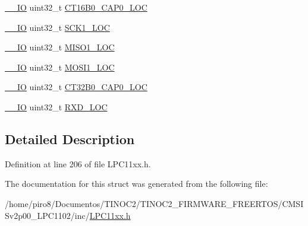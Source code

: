 \begin{DoxyCompactItemize}
\item 
\hyperlink{group___c_m_s_i_s__core__definitions_gaec43007d9998a0a0e01faede4133d6be}{\+\_\+\+\_\+\+IO} uint32\+\_\+t \hyperlink{group___l_p_c11xx___definitions_ga665596a8d6cc6bd6f61485aba90d62c5}{C\+T16\+B0\+\_\+\+C\+A\+P0\+\_\+\+L\+OC}
\item 
\hyperlink{group___c_m_s_i_s__core__definitions_gaec43007d9998a0a0e01faede4133d6be}{\+\_\+\+\_\+\+IO} uint32\+\_\+t \hyperlink{group___l_p_c11xx___definitions_gad6627c21723c298dedcef119bff3ca6e}{S\+C\+K1\+\_\+\+L\+OC}
\item 
\hyperlink{group___c_m_s_i_s__core__definitions_gaec43007d9998a0a0e01faede4133d6be}{\+\_\+\+\_\+\+IO} uint32\+\_\+t \hyperlink{group___l_p_c11xx___definitions_ga3aed5efce144c7f27500230e8cbbbf2f}{M\+I\+S\+O1\+\_\+\+L\+OC}
\item 
\hyperlink{group___c_m_s_i_s__core__definitions_gaec43007d9998a0a0e01faede4133d6be}{\+\_\+\+\_\+\+IO} uint32\+\_\+t \hyperlink{group___l_p_c11xx___definitions_ga50678fa63c5721d9e4622405102531be}{M\+O\+S\+I1\+\_\+\+L\+OC}
\item 
\hyperlink{group___c_m_s_i_s__core__definitions_gaec43007d9998a0a0e01faede4133d6be}{\+\_\+\+\_\+\+IO} uint32\+\_\+t \hyperlink{group___l_p_c11xx___definitions_gaaeedcd139dfd63880543f3498602fe58}{C\+T32\+B0\+\_\+\+C\+A\+P0\+\_\+\+L\+OC}
\item 
\hyperlink{group___c_m_s_i_s__core__definitions_gaec43007d9998a0a0e01faede4133d6be}{\+\_\+\+\_\+\+IO} uint32\+\_\+t \hyperlink{group___l_p_c11xx___definitions_ga8ec4275fda741de5194ccd27dcb0cb22}{R\+X\+D\+\_\+\+L\+OC}
\end{DoxyCompactItemize}


\subsection{Detailed Description}


Definition at line 206 of file L\+P\+C11xx.\+h.



The documentation for this struct was generated from the following file\+:\begin{DoxyCompactItemize}
\item 
/home/piro8/\+Documentos/\+T\+I\+N\+O\+C2/\+T\+I\+N\+O\+C2\+\_\+\+F\+I\+R\+M\+W\+A\+R\+E\+\_\+\+F\+R\+E\+E\+R\+T\+O\+S/\+C\+M\+S\+I\+Sv2p00\+\_\+\+L\+P\+C1102/inc/\hyperlink{_l_p_c11xx_8h}{L\+P\+C11xx.\+h}\end{DoxyCompactItemize}
